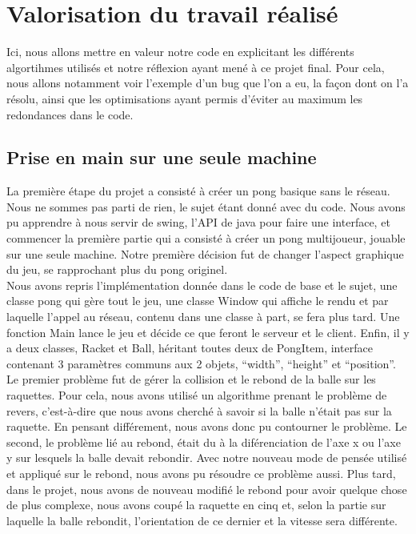 \chapter{Valorisation du travail réalisé}

Ici, nous allons mettre en valeur notre code en explicitant les différents algortihmes utilisés et notre réflexion 
ayant mené à ce projet final. Pour cela, nous allons notamment voir l'exemple d'un bug que l'on a eu, la façon 
dont on l'a résolu, ainsi que les optimisations ayant permis d'éviter au maximum les redondances dans le code.

\section{Prise en main sur une seule machine}
La première étape du projet a consisté à créer un pong basique sans le réseau. Nous ne sommes
pas parti de rien, le sujet étant 
donné avec du code. Nous avons pu apprendre à nous servir de swing,
l'API de java pour faire une interface,
et commencer la première partie qui a consisté à créer un pong multijoueur, jouable sur une seule machine.
Notre première décision fut de changer l'aspect graphique du jeu, se rapprochant plus du pong originel.
\\
Nous avons repris l'implémentation donnée dans le code de base et le sujet, une 
classe pong qui gère tout le jeu, 
une classe Window qui affiche le rendu et par laquelle l'appel au réseau, contenu dans 
une classe à part, se fera plus tard. Une fonction Main 
lance le jeu et décide ce que feront
le serveur et le client. Enfin, il y a deux classes, Racket et Ball, héritant toutes deux de PongItem, interface 
contenant 3 paramètres 
communs aux 2 objets, ``width'', ``height'' et ``position''.
\\
Le premier problème fut de gérer la collision et le rebond de la balle sur les raquettes. 
Pour cela, nous avons utilisé un algorithme prenant le problème de revers, 
c'est-à-dire que nous avons cherché à savoir si la balle n'était pas sur la 
raquette. En pensant différement, nous avons donc pu contourner le problème.
Le second, le problème lié au rebond, était du à la diférenciation de l'axe x ou l'axe y sur 
lesquels la balle devait rebondir. Avec notre nouveau mode de pensée utilisé et appliqué sur 
le rebond, nous avons pu résoudre ce problème aussi.
Plus tard, dans le projet, nous avons de nouveau modifié le rebond pour avoir quelque chose 
de plus complexe, nous avons coupé la 
raquette en cinq et, selon la partie sur laquelle la balle rebondit, l'orientation de ce dernier et la vitesse 
sera différente.


